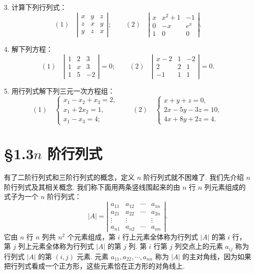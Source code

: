 \documentclass[UTF8, 12pt, fontset=fandol, oneside]{ctexart}
\begin{document}
3. 计算下列行列式：
\[
(1)\quad
\left|\begin{array}{ccc}
x & y & z\\
z & x & y\\
y & z & x
\end{array}\right|;\qquad
(2)\quad
\left|\begin{array}{ccc}
x & x^2+1 & -1\\
0 & -x & e^x\\
1 & 0 & 0
\end{array}\right|.
\]

4. 解下列方程：
\[
(1)\quad
\left|\begin{array}{ccc}
1 & 2 & 3\\
1 & x & 3\\
1 & 5 & -2
\end{array}\right|=0;\qquad
(2)\quad
\left|\begin{array}{ccc}
x-2 & 1 & -2\\
2 & 2 & 1\\
-1 & 1 & 1
\end{array}\right|=0.
\]

5. 用行列式解下列三元一次方程组：
\[
(1)\quad
\left\{
\begin{array}{l}
x_1-x_2+x_3=2,\\
x_1+2x_2=1,\\
x_1-x_3=4;
\end{array}
\right.
\qquad
(2)\quad
\left\{
\begin{array}{l}
x+y+z=0,\\
2x-5y-3z=10,\\
4x+8y+2z=4.
\end{array}
\right.
\]

\section*{§1.3\quad $n$ 阶行列式}

有了二阶行列式和三阶行列式的概念，定义 $n$ 阶行列式就不困难了. 我们先介绍 $n$ 阶行列式及其相关概念. 我们称下面用两条竖线围起来的由 $n$ 行 $n$ 列元素组成的式子为一个 $n$ 阶行列式：
\begin{equation}
|A|=
\left|\begin{array}{cccc}
a_{11} & a_{12} & \cdots & a_{1n}\\
a_{21} & a_{22} & \cdots & a_{2n}\\
\vdots & \vdots & & \vdots\\
a_{n1} & a_{n2} & \cdots & a_{nn}
\end{array}\right|.
\tag{1.3.1}
\end{equation}
它由 $n$ 行 $n$ 列共 $n^2$ 个元素组成，第 $i$ 行上元素全体称为行列式 $|A|$ 的第 $i$ 行，第 $j$ 列上元素全体称为行列式 $|A|$ 的第 $j$ 列. 第 $i$ 行第 $j$ 列交点上的元素 $a_{ij}$ 称为行列式 $|A|$ 的第 $(i,j)$ 元素. 元素 $a_{11},a_{22},\cdots,a_{nn}$ 称为 $|A|$ 的主对角线，因为如果把行列式看成一个正方形，这些元素恰在正方形的对角线上.
\end{document}
